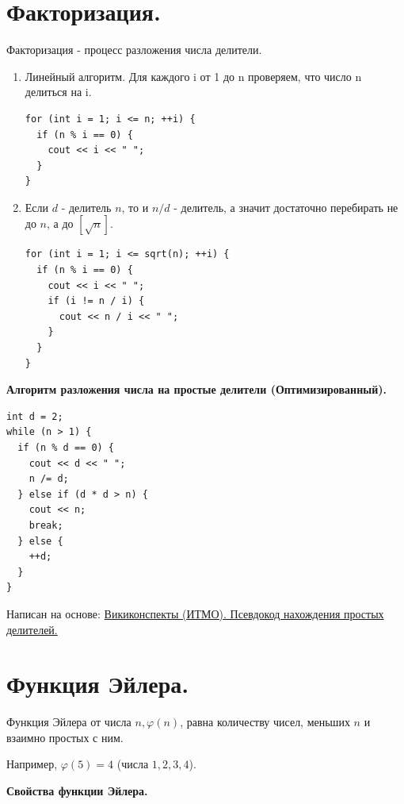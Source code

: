 \section*{Факторизация.}

\Def Факторизация - процесс разложения числа делители.

\begin{enumerate}
    \item Линейный алгоритм. Для каждого i от 1 до n проверяем, что число n делиться на i.
\begin{lstlisting}
for (int i = 1; i <= n; ++i) {
  if (n % i == 0) {  
    cout << i << " ";  
  }  
}
\end{lstlisting}
    \item Если $d$ - делитель $n$, то и $n/d$ - делитель, а значит достаточно перебирать не до $n$, а до $[\sqrt{n}]$.
\begin{lstlisting}
for (int i = 1; i <= sqrt(n); ++i) {  
  if (n % i == 0) {  
    cout << i << " ";  
    if (i != n / i) {  
      cout << n / i << " ";  
    }  
  }  
}
\end{lstlisting}
\end{enumerate}

\textbf{Алгоритм разложения числа на простые делители (Оптимизированный).}

\begin{lstlisting}
int d = 2;
while (n > 1) {
  if (n % d == 0) {
    cout << d << " ";
    n /= d;
  } else if (d * d > n) {
    cout << n;
    break;
  } else {
    ++d;
  }
}
\end{lstlisting}

Написан на основе: \href{https://neerc.ifmo.ru/wiki/index.php?title=Разложение_на_множители_(факторизация)#.D0.9F.D1.81.D0.B5.D0.B2.D0.B4.D0.BE.D0.BA.D0.BE.D0.B4_.D0.BD.D0.B0.D1.85.D0.BE.D0.B6.D0.B4.D0.B5.D0.BD.D0.B8.D1.8F_.D0.BF.D1.80.D0.BE.D1.81.D1.82.D1.8B.D1.85_.D0.BC.D0.BD.D0.BE.D0.B6.D0.B8.D1.82.D0.B5.D0.BB.D0.B5.D0.B9}{Викиконспекты (ИТМО). Псевдокод нахождения простых делителей.}

\section*{Функция Эйлера.}

\Def Функция Эйлера от числа $n, \varphi(n)$, равна количеству чисел, меньших $n$ и взаимно простых с ним. 

Например, $\varphi(5) = 4$ (числа $1, 2, 3, 4$).

\textbf{Свойства функции Эйлера.}

